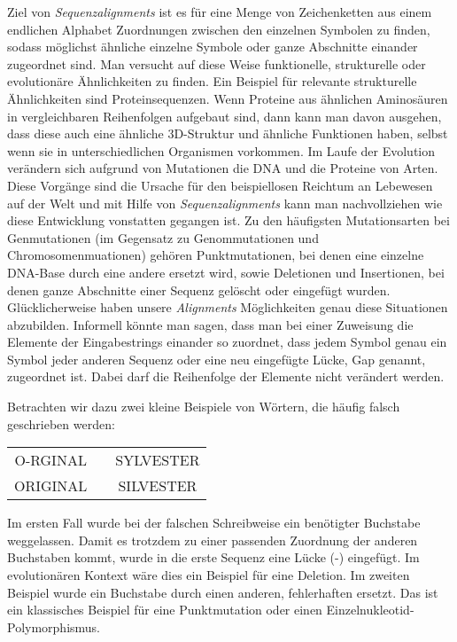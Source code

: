 Ziel von \emph{Sequenzalignments} ist es für eine Menge von Zeichenketten aus einem endlichen Alphabet Zuordnungen zwischen den einzelnen Symbolen zu finden, sodass möglichst ähnliche einzelne Symbole oder ganze Abschnitte einander zugeordnet sind. Man versucht auf diese Weise funktionelle, strukturelle oder evolutionäre Ähnlichkeiten zu finden. Ein Beispiel für relevante strukturelle Ähnlichkeiten sind Proteinsequenzen. Wenn Proteine aus ähnlichen Aminosäuren in vergleichbaren Reihenfolgen aufgebaut sind, dann kann man davon ausgehen, dass diese auch eine ähnliche 3D-Struktur und ähnliche Funktionen haben, selbst wenn sie in unterschiedlichen Organismen vorkommen. Im Laufe der Evolution verändern sich aufgrund von Mutationen die DNA und die Proteine von Arten. Diese Vorgänge sind die Ursache für den beispiellosen Reichtum an Lebewesen auf der Welt und mit Hilfe von \emph{Sequenzalignments} kann man nachvollziehen wie diese Entwicklung vonstatten gegangen ist. Zu den häufigsten Mutationsarten bei Genmutationen (im Gegensatz zu Genommutationen und Chromosomenmuationen) gehören Punktmutationen, bei denen eine einzelne DNA-Base durch eine andere ersetzt wird, sowie Deletionen und Insertionen, bei denen ganze Abschnitte einer Sequenz gelöscht oder eingefügt wurden. Glücklicherweise haben unsere \emph{Alignments} Möglichkeiten genau diese Situationen abzubilden. Informell könnte man sagen, dass man bei einer Zuweisung die Elemente der Eingabestrings einander so zuordnet, dass jedem Symbol genau ein Symbol jeder anderen Sequenz oder eine neu eingefügte Lücke, Gap genannt, zugeordnet ist. Dabei darf die Reihenfolge der Elemente nicht verändert werden.

Betrachten wir dazu zwei kleine Beispiele von Wörtern, die häufig falsch geschrieben werden:

\ttfamily
\begin{center}
\begin{tabular}{ccc}
		O-RGINAL & \hspace{2cm} & SYLVESTER \\
		ORIGINAL & \hspace{2cm} & SILVESTER
\end{tabular}
\end{center}
\normalfont

Im ersten Fall wurde bei der falschen Schreibweise ein benötigter Buchstabe weggelassen. Damit es trotzdem zu einer passenden Zuordnung der anderen Buchstaben kommt, wurde in die erste Sequenz eine Lücke (-) eingefügt. Im evolutionären Kontext wäre dies ein Beispiel für eine Deletion. Im zweiten Beispiel wurde ein Buchstabe durch einen anderen, fehlerhaften ersetzt. Das ist ein klassisches Beispiel für eine Punktmutation oder einen Einzelnukleotid-Polymorphismus.

